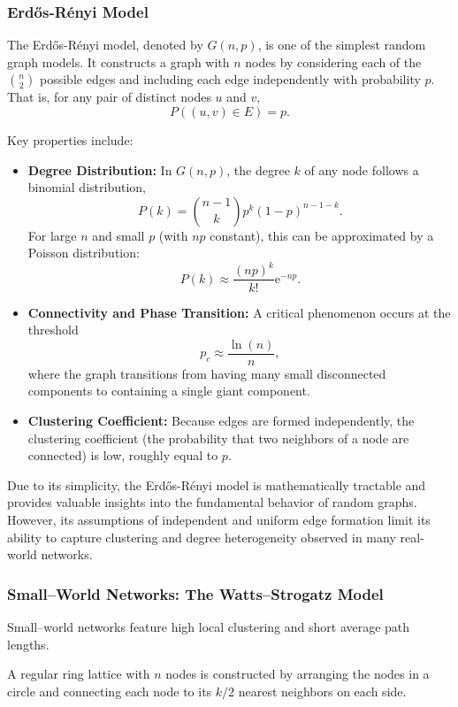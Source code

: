 \documentclass[11pt, headings=standardclasses, parskip=half, twoside]{scrartcl}
\begin{document}
\subsubsection{Erdős-Rényi Model}\label{subsubsec:ER}
\begin{definition}\label{def:ER}
The Erdős-Rényi model, denoted by \(G(n,p)\), is one of the simplest random graph models. 
It constructs a graph with \(n\) nodes by considering each of the \(\binom{n}{2}\) possible edges and including each edge independently with probability \(p\). 
That is, for any pair of distinct nodes \(u\) and \(v\),
\[
P((u,v)\in E)=p.
\]
\end{definition}
Key properties include:
\begin{itemize}
  \item \textbf{Degree Distribution:} In \(G(n,p)\), the degree \(k\) of any node follows a binomial distribution,
  \[
  P(k)=\binom{n-1}{k} p^k (1-p)^{n-1-k}.
  \]
  For large \(n\) and small \(p\) (with \(np\) constant), this can be approximated by a Poisson distribution:
  \[
  P(k)\approx \frac{(np)^k}{k!} \mathrm{e}^{-np}.
  \]
  \item \textbf{Connectivity and Phase Transition:}
  A critical phenomenon occurs at the threshold
  \[
  p_c\approx \frac{\ln(n)}{n},
  \]
  where the graph transitions from having many small disconnected components to containing a single giant component.
  \item \textbf{Clustering Coefficient:} 
  Because edges are formed independently, the clustering coefficient (the probability that two neighbors of a node are connected) is low, roughly equal to \(p\).
\end{itemize}

Due to its simplicity, the Erdős-Rényi model is mathematically tractable and provides valuable insights into the fundamental behavior of random graphs.
However, its assumptions of independent and uniform edge formation limit its ability to capture clustering and degree heterogeneity observed in many real-world networks.

\subsubsection{Small–World Networks: The Watts–Strogatz Model}\label{subsubsec:WS}
Small–world networks feature high local clustering and short average path lengths.

\begin{definition}\label{def:ringlattice}
A regular ring lattice with \(n\) nodes is constructed by arranging the nodes in a circle and connecting each node to its \(k/2\) nearest neighbors on each side.
\end{definition}
\end{document}
